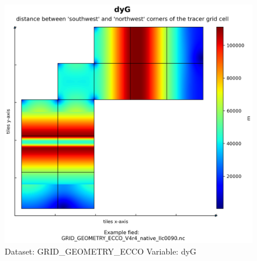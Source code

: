 \begin{figure}[H]
\centering
\includegraphics[width=\textwidth]{../images/plots/native_plots_coords/Geometry_Parameters_for_the_Lat-Lon-Cap_90_(llc90)_Native_Model_Grid_(Version_4_Release_4)/dyG.png}
\caption{Dataset: GRID\_GEOMETRY\_ECCO Variable: dyG}
\label{tab:table-GRID_GEOMETRY_ECCO_dyG-Plot}
\end{figure}
\pagebreak

